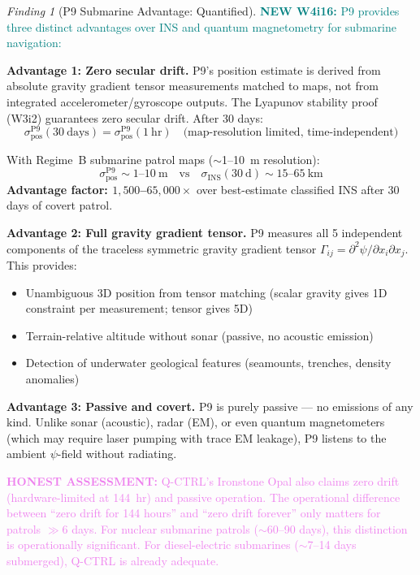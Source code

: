 \documentclass[11pt]{article}
\theoremstyle{definition}
\theoremstyle{remark}
\newtheorem{finding}[theorem]{Finding}
\newcommand{\honest}[1]{\textcolor{violet}{\textbf{HONEST ASSESSMENT:} #1}}
\newcommand{\newfinding}[1]{\textcolor{teal}{\textbf{NEW W4i16:} #1}}
\begin{document}
\begin{finding}[P9 Submarine Advantage: Quantified]
\label{find:submarine}
\newfinding{P9 provides three distinct advantages over INS and
quantum magnetometry for submarine navigation:}

\textbf{Advantage 1: Zero secular drift.}
P9's position estimate is derived from absolute gravity gradient
tensor measurements matched to maps, not from integrated
accelerometer/gyroscope outputs. The Lyapunov stability proof
(W3i2) guarantees zero secular drift. After 30 days:
\begin{equation}
\sigma_{\mathrm{pos}}^{\mathrm{P9}}(30~\mathrm{days})
= \sigma_{\mathrm{pos}}^{\mathrm{P9}}(1~\mathrm{hr})
\quad \text{(map-resolution limited, time-independent)}
\end{equation}

With Regime~B submarine patrol maps ($\sim$1--10~m resolution):
\begin{equation}
\sigma_{\mathrm{pos}}^{\mathrm{P9}} \sim 1\text{--}10~\mathrm{m}
\quad \text{vs} \quad
\sigma_{\mathrm{INS}}(30~\mathrm{d}) \sim 15\text{--}65~\mathrm{km}
\end{equation}
\textbf{Advantage factor: $1{,}500$--$65{,}000\times$} over best-estimate
classified INS after 30 days of covert patrol.

\textbf{Advantage 2: Full gravity gradient tensor.}
P9 measures all 5 independent components of the traceless symmetric
gravity gradient tensor $\Gamma_{ij} = \partial^2 \psi/\partial x_i
\partial x_j$. This provides:
\begin{itemize}[nosep]
  \item Unambiguous 3D position from tensor matching (scalar gravity
    gives 1D constraint per measurement; tensor gives 5D)
  \item Terrain-relative altitude without sonar (passive, no
    acoustic emission)
  \item Detection of underwater geological features (seamounts,
    trenches, density anomalies)
\end{itemize}

\textbf{Advantage 3: Passive and covert.}
P9 is purely passive --- no emissions of any kind. Unlike sonar
(acoustic), radar (EM), or even quantum magnetometers (which may
require laser pumping with trace EM leakage), P9 listens to the
ambient $\psi$-field without radiating.

\honest{Q-CTRL's Ironstone Opal also claims zero drift (hardware-limited
at 144~hr) and passive operation. The operational difference between
``zero drift for 144 hours'' and ``zero drift forever'' only matters
for patrols $\gg$6 days. For nuclear submarine patrols ($\sim$60--90 days),
this distinction is operationally significant. For diesel-electric
submarines ($\sim$7--14 days submerged), Q-CTRL is already adequate.}
\end{finding}
\end{document}
